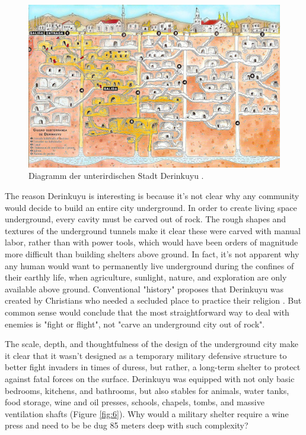 \documentclass[10pt,twocolumn,letterpaper]{article}
\begin{document}
\begin{figure}[b]
\begin{center}
   \includegraphics[width=1\linewidth]{derinkuyu.jpeg}
\end{center}
   \caption{Diagramm der unterirdischen Stadt Derinkuyu \cite{56}.}
\label{fig:5}
\label{fig:onecol}
\end{figure}
The reason Derinkuyu is interesting is because it's not clear why any community would decide to build an entire city underground. In order to create living space underground, every cavity must be carved out of rock. The rough shapes and textures of the underground tunnels make it clear these were carved with manual labor, rather than with power tools, which would have been orders of magnitude more difficult than building shelters above ground. In fact, it's not apparent why any human would want to permanently live underground during the confines of their earthly life, when agriculture, sunlight, nature, and exploration are only available above ground. Conventional "history" proposes that Derinkuyu was created by Christians who needed a secluded place to practice their religion \cite{53}. But common sense would conclude that the most straightforward way to deal with enemies is "fight or flight", not "carve an underground city out of rock".

The scale, depth, and thoughtfulness of the design of the underground city make it clear that it wasn't designed as a temporary military defensive structure to better fight invaders in times of duress, but rather, a long-term shelter to protect against fatal forces on the surface. Derinkuyu was equipped with not only basic bedrooms, kitchens, and bathrooms, but also stables for animals, water tanks, food storage, wine and oil presses, schools, chapels, tombs, and massive ventilation shafts (Figure \ref{fig:6}). Why would a military shelter require a wine press and need to be be dug 85 meters deep with such complexity?
\end{document}
